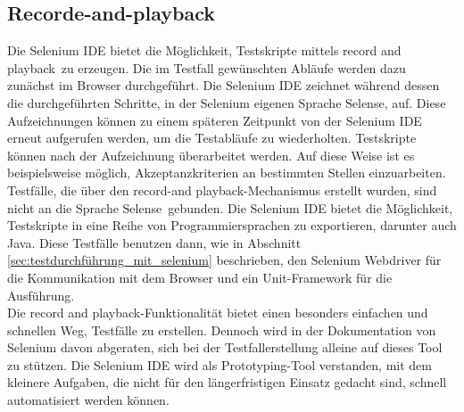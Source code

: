 \subsection{Recorde-and-playback}
\label{sec:recorde_and_playback}
Die Selenium IDE bietet die Möglichkeit, Testskripte mittels \grq record and playback\grq\ zu erzeugen.
Die im Testfall gewünschten Abläufe werden dazu zunächst im Browser durchgeführt.
Die Selenium IDE zeichnet während dessen die durchgeführten Schritte, in der Selenium eigenen Sprache \grq Selense\grq, auf. Diese Aufzeichnungen können zu einem späteren Zeitpunkt von der Selenium IDE erneut aufgerufen werden, um die Testabläufe zu wiederholten.
Testskripte können nach der Aufzeichnung überarbeitet werden. Auf diese Weise ist es beispielsweise möglich, Akzeptanzkriterien an bestimmten Stellen einzuarbeiten.\\
Testfälle, die über den \grq record-and playback\grq -Mechanismus erstellt wurden, sind nicht an die Sprache \grq Selense\grq\ gebunden. Die Selenium IDE bietet die Möglichkeit, Testskripte in eine Reihe von Programmiersprachen zu exportieren, darunter auch Java.
Diese Testfälle benutzen dann, wie in Abschnitt \ref{sec:testdurchführung_mit_selenium} beschrieben, den Selenium Webdriver für die Kommunikation mit dem Browser und ein Unit-Framework für die Ausführung.\\
Die \grq record and playback\grq -Funktionalität bietet einen besonders einfachen und schnellen Weg, Testfälle zu erstellen. Dennoch wird in der Dokumentation von Selenium \cite{selenium_selenium_2015-1} davon abgeraten, sich bei der Testfallerstellung alleine auf dieses Tool zu stützen. Die Selenium IDE wird als Prototyping-Tool verstanden, mit dem kleinere Aufgaben, die nicht für den längerfristigen Einsatz gedacht sind, schnell automatisiert werden können.

